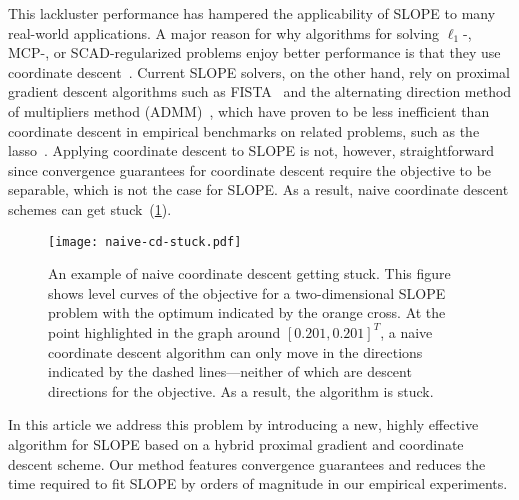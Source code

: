 This lackluster performance has hampered the applicability of SLOPE to many
real-world applications. A major reason for why algorithms for solving
$\ell_1$-, MCP-, or SCAD-regularized problems enjoy better performance is that
they use coordinate
descent~\cite{tseng2001convergence,friedman2010,breheny2011}. Current SLOPE
solvers, on the other hand, rely on proximal gradient descent algorithms such
as FISTA~\cite{beck2009} and the alternating direction method of multipliers
method (ADMM)~\cite{boyd2010}, which have proven to be less inefficient than
coordinate descent in empirical benchmarks on related problems, such as the
lasso~\cite{moreau2022benchopt}. Applying coordinate descent to SLOPE is not,
however, straightforward since convergence guarantees for coordinate descent
require the objective to be separable, which is not the case for SLOPE. As a
result, naive coordinate descent schemes can get
stuck~(\cref{fig:naive-cd-stuck}).

\begin{figure}[htpb]
  \centering
  \texttt{[image: naive-cd-stuck.pdf]}
  \caption{%
    An example of naive coordinate descent getting stuck. This figure shows
    level curves of the objective for a two-dimensional SLOPE problem with the
    optimum indicated by the orange cross. At the point highlighted in the
    graph around \([0.201,0.201]^T\), a naive coordinate descent algorithm can
    only move in the directions indicated by the dashed lines---neither of which
    are descent directions for the objective. As a result, the algorithm is
    stuck.
  }
  \label{fig:naive-cd-stuck}
\end{figure}


In this article we address this problem by introducing a new, highly effective
algorithm for SLOPE based on a hybrid proximal gradient and coordinate descent
scheme. Our method features convergence guarantees and reduces the time
required to fit SLOPE by orders of magnitude in our empirical experiments.

